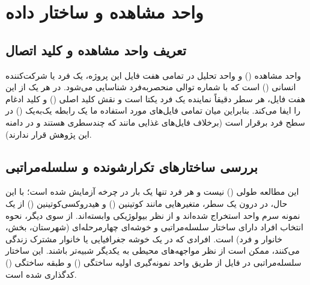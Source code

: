 \documentclass[12pt]{exam}
\begin{document}
\section{واحد مشاهده و ساختار داده}

\subsection{تعریف واحد مشاهده و کلید اتصال}
واحد مشاهده () و واحد تحلیل در تمامی هفت فایل این پروژه، یک فرد یا شرکت‌کننده انسانی () است که با شماره توالی منحصر‌به‌فرد  شناسایی می‌شود. در هر یک از این هفت فایل، هر سطر دقیقاً نماینده یک فرد یکتا است و  نقش کلید اصلی () و کلید ادغام را ایفا می‌کند. بنابراین میان تمامی فایل‌های مورد استفاده ما یک رابطه یک‌به‌یک () در سطح فرد برقرار است (برخلاف فایل‌های غذایی مانند  که چندسطری هستند و در دامنه این پژوهش قرار ندارند).

\subsection{بررسی ساختارهای تکرارشونده و سلسله‌مراتبی}
این مطالعه طولی () نیست و هر فرد تنها یک بار در چرخه  آزمایش شده است؛ با این حال، در درون یک سطر، متغیرهایی مانند کوتینین () و هیدروکسی‌کوتینین () از یک نمونه سرم واحد استخراج شده‌اند و از نظر بیولوژیکی وابسته‌اند. از سوی دیگر، نحوه انتخاب افراد دارای ساختار سلسله‌مراتبی و خوشه‌ای چهارمرحله‌ای (شهرستان، بخش، خانوار و فرد) است. افرادی که در یک خوشه جغرافیایی یا خانوار مشترک زندگی می‌کنند، ممکن است از نظر مواجهه‌های محیطی به یکدیگر شبیه‌تر باشند. این ساختار سلسله‌مراتبی در فایل  از طریق واحد نمونه‌گیری اولیه ساختگی () و طبقه ساختگی () کدگذاری شده است.
\end{document}
